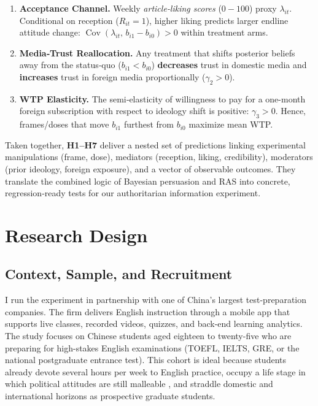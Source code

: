 \documentclass[12pt, american]{article}
\begin{document}
\begin{enumerate}[label=\textbf{H\arabic*}, leftmargin=1.25cm]
\item \textbf{Acceptance Channel.}
      Weekly \emph{article‐liking scores} ($0\!-\!100$) proxy $\lambda_{it}$.
      Conditional on reception ($R_{it}=1$), higher liking predicts larger
      endline attitude change: $\operatorname{Cov}(\lambda_{it},\,
      b_{i1}-b_{i0})>0$ within treatment arms.

\item \textbf{Media‐Trust Reallocation.}
      Any treatment that shifts posterior beliefs away from the status‐quo
      ($b_{i1}<b_{i0}$) \textbf{decreases} trust in domestic media and
      \textbf{increases} trust in foreign media proportionally
      ($\gamma_2>0$).

\item \textbf{WTP Elasticity.}
      The semi‐elasticity of willingness to pay for a one-month foreign
      subscription with respect to ideology shift is positive:
      $\gamma_3>0$.  Hence, frames/doses that move $b_{i1}$ furthest from
      $b_{i0}$ maximize mean WTP.

\end{enumerate}

\vspace{0.5em}
Taken together, \textbf{H1–H7} deliver a nested set of predictions linking
experimental manipulations (frame, dose), mediators (reception, liking,
credibility), moderators (prior ideology, foreign exposure), and a vector of
observable outcomes.  They translate the combined logic of Bayesian
persuasion and RAS into concrete, regression‐ready tests for our
authoritarian information experiment.




\section{Research Design}



\subsection{Context, Sample, and Recruitment}

I run the experiment in partnership with one of China’s largest test-preparation companies.  The firm delivers English instruction through a  mobile app that supports live classes, recorded videos, quizzes, and back-end learning analytics.  The study focuses on Chinese students aged eighteen to twenty-five who are preparing for high-stakes English examinations (TOEFL, IELTS, GRE, or the national postgraduate entrance test).  This cohort is ideal because students already devote several hours per week to English practice, occupy a life stage in which political attitudes are still malleable \citep{sears1999evidence}, and straddle domestic and international horizons as prospective graduate students.
\end{document}

